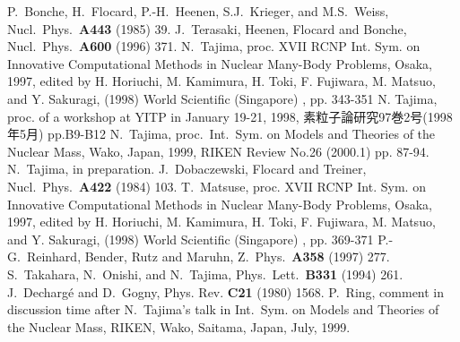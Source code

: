 \begin{thebibliography}{99}
{\small
   \setlength{\labelwidth}{8mm}
   \setlength{\labelsep}{0.5mm}
   \setlength{\leftmargin}{8.5mm}
   \setlength{\rightmargin}{0mm}
   \setlength{\listparindent}{0mm}
   \setlength{\parsep}{0mm}
   \setlength{\itemsep}{0mm}
\baselineskip=0.5cm
         P.~Bonche, H.~Flocard, P.-H.~Heenen, S.J.~Krieger, and M.S.~Weiss,
         Nucl.\ Phys.\ {\bf A443} (1985) 39.
         J.~Terasaki, Heenen, Flocard and Bonche,
         Nucl.\ Phys.\ {\bf A600} (1996) 371.
        N.~Tajima,
        proc. XVII RCNP Int. Sym. on Innovative Computational Methods
        in Nuclear Many-Body Problems, Osaka, 1997,
        edited by H. Horiuchi, M. Kamimura, H. Toki, F. Fujiwara, M. Matsuo,
        and Y. Sakuragi,
        (1998) World Scientific (Singapore) , pp. 343-351
         N. Tajima, proc. of a workshop at YITP in January 19-21, 1998, 
         素粒子論研究97巻2号(1998年5月) pp.B9-B12
        N.~Tajima,
        proc.\ Int.\ Sym. on Models and Theories of the Nuclear Mass,
        Wako, Japan, 1999,
        RIKEN Review No.26 (2000.1) pp. 87-94.
        N.~Tajima,
        in preparation.
         J.~Dobaczewski, Flocard and Treiner,
         Nucl.\ Phys.\ {\bf A422} (1984) 103.
        T.~Matsuse,
        proc. XVII RCNP Int. Sym. on Innovative Computational Methods
        in Nuclear Many-Body Problems, Osaka, 1997,
        edited by H. Horiuchi, M. Kamimura, H. Toki, F. Fujiwara, M. Matsuo,
        and Y. Sakuragi,
        (1998) World Scientific (Singapore) , pp. 369-371
         P.-G.~Reinhard, Bender, Rutz and Maruhn,
         Z.\ Phys.\ {\bf A358} (1997) 277.
         S.~Takahara, N.~Onishi, and N.~Tajima,
         Phys.\ Lett.\ {\bf B331} (1994) 261.
         J.~Decharg\'{e} and D.~Gogny,
         Phys. Rev. {\bf C21} (1980) 1568.
        P.~Ring,
        comment in discussion time after N.~Tajima's talk in
        Int.\ Sym. on Models and Theories of the Nuclear Mass,
        RIKEN, Wako, Saitama, Japan, July, 1999.
}
\end{thebibliography}


